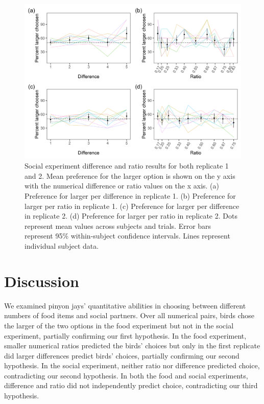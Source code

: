 \documentclass[
  ,pub,floatsintext]{apa6}
\begin{document}
\begin{figure}

{\centering \includegraphics[width=0.9\linewidth]{figures/social_figure} 

}

\caption{Social experiment difference and ratio results for both replicate 1 and 2. Mean preference for the larger option is shown on the y axis with the numerical difference or ratio values on the x axis. (a) Preference for larger per difference in replicate 1. (b) Preference for larger per ratio in replicate 1. (c) Preference for larger per difference in replicate 2. (d) Preference for larger per ratio in replicate 2. Dots represent mean values across subjects and trials. Error bars represent 95\% within-subject confidence intervals. Lines represent individual subject data.}\label{fig:socialgraphs}
\end{figure}

\hypertarget{discussion}{%
\section{Discussion}\label{discussion}}

We examined pinyon jays' quantitative abilities in choosing between different numbers of food items and social partners. Over all numerical pairs, birds chose the larger of the two options in the food experiment but not in the social experiment, partially confirming our first hypothesis. In the food experiment, smaller numerical ratios predicted the birds' choices but only in the first replicate did larger differences predict birds' choices, partially confirming our second hypothesis. In the social experiment, neither ratio nor difference predicted choice, contradicting our second hypothesis. In both the food and social experiments, difference and ratio did not independently predict choice, contradicting our third hypothesis.
\end{document}
